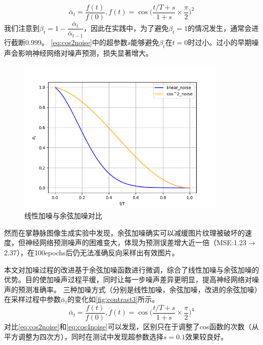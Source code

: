 \begin{equation}
    \label{eq:cos2noise}
    \bar{\alpha}_t=\frac{f(t)}{f(0)},f(t)=\cos\Big(\frac{t/T+s}{1+s}\times\frac{\pi}{2}\Big)^2
\end{equation}
我们注意到$\beta_t=1-\dfrac{\bar{\alpha}_t}{\bar{\alpha}_{t-1}}$，因此在实践中，为了避免$\beta_t=1$的情况发生，通常会进行截断0.999。
\autoref{eq:cos2noise}中的超参数$s$能够避免$\beta_t$在$t=0$时过小。过小的早期噪声会影响神经网络对噪声预测，损失显著增大。

\begin{figure}[!htbp]
    \centering
    \includegraphics[width=10cm]{image/chap03/contrast2.png}
    \caption{线性加噪与余弦加噪对比}
    \label{fig:contrast2}
\end{figure}

然而在掌静脉图像生成实验中发现，余弦加噪确实可以减缓图片纹理被破坏的速度，但神经网络预测噪声的困难变大，体现为预测误差增大近一倍（MSE:1.23$\rightarrow$2.37），在100epochs后仍无法准确反向采样出有效图片。

本文对加噪过程的改进基于余弦加噪函数进行微调，综合了线性加噪与余弦加噪的优势。目的使加噪声过程平缓，同时让每一步噪声差异更明显，提高神经网络对噪声的预测准确率。
三种加噪方式（分别是线性加噪，余弦加噪，改进的余弦加噪）在采样过程中参数$\bar{\alpha}_t$的变化如\autoref{fig:contrast3}所示。
\begin{equation}
    \label{eq:cos4noise}
    \bar{\alpha}_t=\frac{f(t)}{f(0)},f(t)=\cos\Big(\frac{t/T+s}{1+s}\times\frac{\pi}{2}\Big)^4
\end{equation}
对比\autoref{eq:cos2noise}和\autoref{eq:cos4noise}可以发现，区别只在于调整了cos函数的次数（从平方调整为四次方），同时在测试中发现超参数选择$s=0.1$效果较良好。

